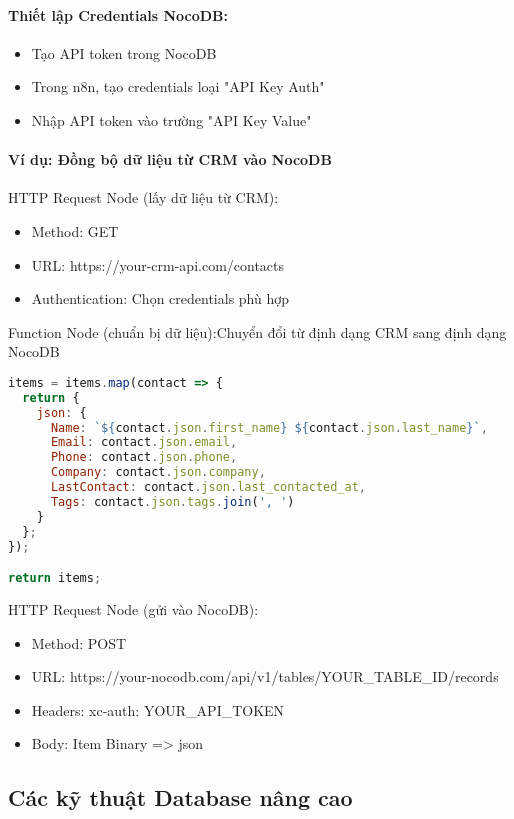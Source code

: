 \paragraph{Thiết lập Credentials NocoDB:}
\begin{itemize}
    \item Tạo API token trong NocoDB
    \item Trong n8n, tạo credentials loại "API Key Auth"
    \item Nhập API token vào trường "API Key Value"
\end{itemize}

\paragraph{Ví dụ: Đồng bộ dữ liệu từ CRM vào NocoDB}

HTTP Request Node (lấy dữ liệu từ CRM):
\begin{itemize}
    \item Method: GET
    \item URL: https://your-crm-api.com/contacts
    \item Authentication: Chọn credentials phù hợp
\end{itemize}


Function Node (chuẩn bị dữ liệu):Chuyển đổi từ định dạng CRM sang định dạng NocoDB
\begin{lstlisting}[language=JavaScript]
items = items.map(contact => {
  return {
    json: {
      Name: `${contact.json.first_name} ${contact.json.last_name}`,
      Email: contact.json.email,
      Phone: contact.json.phone,
      Company: contact.json.company,
      LastContact: contact.json.last_contacted_at,
      Tags: contact.json.tags.join(', ')
    }
  };
});

return items;
\end{lstlisting}

HTTP Request Node (gửi vào NocoDB):
\begin{itemize}
    \item Method: POST
    \item URL: https://your-nocodb.com/api/v1/tables/YOUR\_TABLE\_ID/records
    \item Headers: xc-auth: YOUR\_API\_TOKEN
    \item Body: Item Binary => json
\end{itemize}

\subsection{Các kỹ thuật Database nâng cao}


